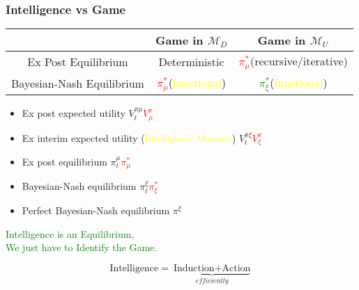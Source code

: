 \documentclass[UTF8,11pt,colorlinks,compress,openany]{beamer}%
\begin{document}
\begin{frame}\frametitle{Intelligence vs Game}
	\begin{table}[H]
		\begin{center}
			\begin{minipage}{70ex}
					\centering\begin{tabu}{c|c|c}
					\hline
						&Game in $\mathcal{M}_D$ &Game in $\mathcal{M}_U$\\
						\hline
						Ex Post Equilibrium &Deterministic &\textcolor{red}{$\pi_\mu^*$}(recursive/iterative)\\
						\hline
						Bayesian-Nash Equilibrium & \textcolor{red}{$\pi_\mu^*$}(\textcolor{yellow}{functional}) &\textcolor{green}{$\pi_\xi^*$}(\textcolor{yellow}{functional})\\
					\hline
					\end{tabu}
			\end{minipage}
		\end{center}
	\end{table}
	\begin{center}
		\begin{minipage}{.87\textwidth}
			\begin{itemize}
				\item Ex post expected utility $V_t^{\pi\mu}$\hfill \textcolor{red}{$V_\mu^\pi$}
				\item Ex interim expected utility (\textcolor{yellow}{Intelligence Measure}) $V_t^{\pi\xi}$\hfill \textcolor{red}{$V_\xi^\pi$}
				\item Ex post equilibrium $\pi_t^\mu$\hfill \textcolor{red}{$\pi_\mu^*$}
				\item Bayesian-Nash equilibrium $\pi_t^\xi$\hfill \textcolor{red}{$\pi_\xi^*$}
				\item Perfect Bayesian-Nash equilibrium $\pi^\xi$
			\end{itemize}
		\end{minipage}
	\end{center}
	\begin{center}
		\textcolor{green}{\Large Intelligence is an Equilibrium,\\
			We just have to Identify the Game.}
	\end{center}
	\[\text{Intelligence}=\underbrace{\text{Induction}+\text{Action}}_{\textit{efficiently}}\]
\end{frame}
\end{document}
